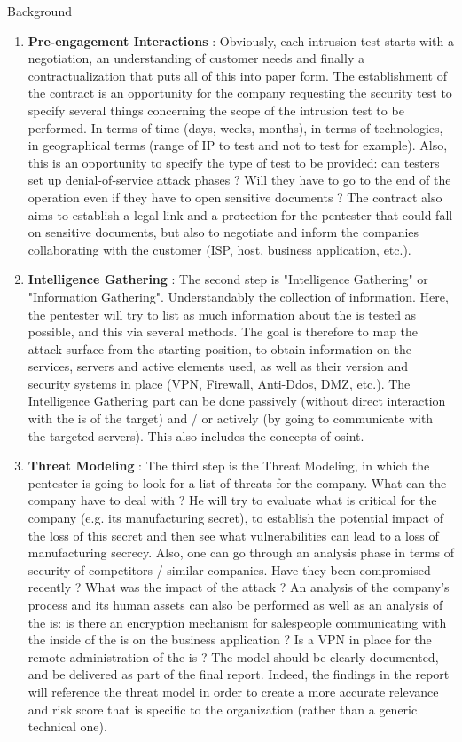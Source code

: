 \begin{chaptercover}{Background}
\begin{enumerate}
  \item \textbf{Pre-engagement Interactions} : Obviously, each intrusion test starts with a negotiation, an understanding of customer needs and finally a contractualization that puts all of this into paper form. The establishment of the contract is an opportunity for the company requesting the security test to specify several things concerning the scope of the intrusion test to be performed. In terms of time (days, weeks, months), in terms of technologies, in geographical terms (range of IP to test and not to test for example). Also, this is an opportunity to specify the type of test to be provided: can testers set up denial-of-service attack phases ? Will they have to go to the end of the operation even if they have to open sensitive documents ? The contract also aims to establish a legal link and a protection for the pentester that could fall on sensitive documents, but also to negotiate and inform the companies collaborating with the customer (ISP, host, business application, etc.).
  \item \textbf{Intelligence Gathering} : The second step is "Intelligence Gathering" or "Information Gathering". Understandably the collection of information. Here, the pentester will try to list as much information about the \acrshort{is} tested as possible, and this via several methods. The goal is therefore to map the attack surface from the starting position, to obtain information on the services, servers and active elements used, as well as their version and security systems in place (VPN, Firewall, Anti-Ddos, DMZ, etc.). The Intelligence Gathering part can be done passively (without direct interaction with the \acrshort{is} of the target) and / or actively (by going to communicate with the targeted servers). This also includes the concepts of \acrfull{osint}.
  \item \textbf{Threat Modeling} : The third step is the Threat Modeling, in which the pentester is going to look for a list of threats for the company. What can the company have to deal with ? He will try to evaluate what is critical for the company (e.g. its manufacturing secret), to establish the potential impact of the loss of this secret and then see what vulnerabilities can lead to a loss of manufacturing secrecy. Also, one can go through an analysis phase in terms of security of competitors / similar companies. Have they been compromised recently ? What was the impact of the attack ? An analysis of the company's process and its human assets can also be performed as well as an analysis of the \acrshort{is}: is there an encryption mechanism for salespeople communicating with the inside of the \acrshort{is} on the business application ? Is a VPN in place for the remote administration of the \acrshort{is} ? The model should be clearly documented, and be delivered as part of the final report. Indeed, the findings in the report will reference the threat model in order to create a more accurate relevance and risk score that is specific to the organization (rather than a generic technical one).

\end{enumerate}
\end{chaptercover}
